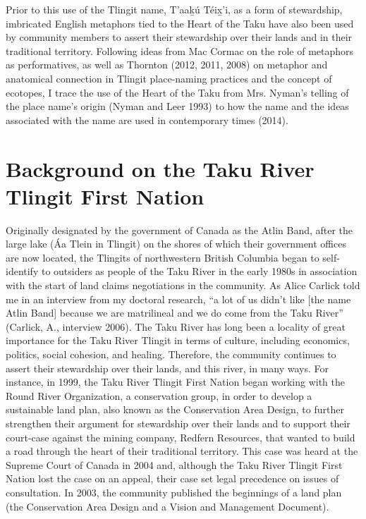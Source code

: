 Prior to this use of the Tlingit name, T'aak̲ú Téix̲'i, as a form of stewardship, imbricated English metaphors tied to the Heart of the Taku have also been used by community members to assert their stewardship over their lands and in their traditional territory. Following ideas from Mac Cormac on the role of metaphors as performatives, as well as Thornton (2012, 2011, 2008) on metaphor and anatomical connection in Tlingit place-naming practices and the concept of ecotopes, I trace the use of the Heart of the Taku from Mrs. Nyman’s telling of the place name’s origin (Nyman and Leer 1993) to how the name and the ideas associated with the name are used in contemporary times (2014).

\section{Background on the Taku River Tlingit First Nation}

Originally designated by the government of Canada as the Atlin Band, after the large lake (Áa Tlein in Tlingit) on the shores of which their government offices are now located, the Tlingits of northwestern British Columbia began to self-identify to outsiders as people of the Taku River in the early 1980s in association with the start of land claims negotiations in the community. As Alice Carlick told me in an interview from my doctoral research, “a lot of us didn’t like [the name Atlin Band] because we are matrilineal and we do come from the Taku River” (Carlick, A., interview 2006). The Taku River has long been a locality of great importance for the Taku River Tlingit in terms of culture, including economics, politics, social cohesion, and healing. Therefore, the community continues to assert their stewardship over their lands, and this river, in many ways. For instance, in 1999, the Taku River Tlingit First Nation began working with the Round River Organization, a conservation group, in order to develop a sustainable land plan, also known as the Conservation Area Design, to further strengthen their argument for stewardship over their lands and to support their court-case against the mining company, Redfern Resources, that wanted to build a road through the heart of their traditional territory. This case was heard at the Supreme Court of Canada in 2004 and, although the Taku River Tlingit First Nation lost the case on an appeal, their case set legal precedence on issues of consultation. In 2003, the community published the beginnings of a land plan (the Conservation Area Design and a Vision and Management Document).

